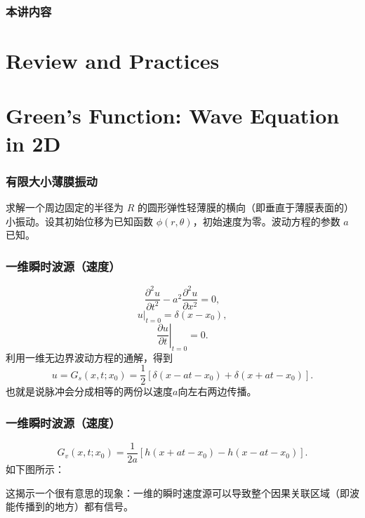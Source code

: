 \documentclass[CJK]{beamer}
\date{}
\begin{document}
  \bch
{}

\begin{frame}
  \frametitle{本讲内容}
  
\tableofcontents

\end{frame}

\section{Review and Practices}




\section{Green's Function: Wave Equation in 2D}

\begin{frame}
  \frametitle{有限大小薄膜振动}
求解一个周边固定的半径为 $R$ 的圆形弹性轻薄膜的横向（即垂直于薄膜表面的）小振动。设其初始位移为已知函数 $\phi(r,\theta)$，初始速度为零。波动方程的参数 $a$ 已知。
  
\end{frame}

\begin{frame}
  \frametitle{一维瞬时波源（速度）}
  $$\frac{\partial^2u}{\partial t^2}-a^2\frac{\partial^2u }{\partial x^2} = 0, $$
  $$\left. u\right\vert_{t=0} = \delta(x-x_0),$$
  $$\left. \frac{\partial u}{\partial t}\right\vert_{t=0} = 0.$$  
  利用一维无边界波动方程的通解，得到
  $$ u = G_s(x,t;x_0) = \frac{1}{2}\left[\delta(x-at-x_0) + \delta(x+at-x_0)\right].$$
  也就是说脉冲会分成相等的两份以速度$a$向左右两边传播。

\end{frame}

\begin{frame}
  \frametitle{一维瞬时波源（速度）}
  
  $$G_v(x,t;x_0) = \frac{1}{2a}\left[h(x+at-x_0) - h(x-at-x_0)\right].$$
  如下图所示：
  

  这揭示一个很有意思的现象：一维的瞬时速度源可以导致整个因果关联区域（即波能传播到的地方）都有信号。
\end{frame}
\end{document}
